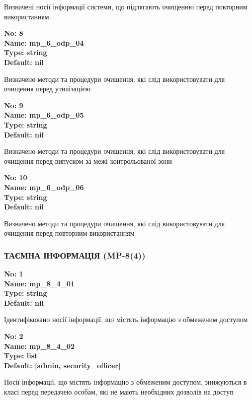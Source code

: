 \documentclass{article}
\begin{document}
{\footnotesize Визначені носії інформації системи, що підлягають очищенню перед повторним використанням}


{\footnotesize\bfseries
No: 8\\
Name: mp\_6\_odp\_04\\
Type: string\\
Default: nil
}

{\footnotesize Визначено методи та процедури очищення, які слід використовувати для очищення перед утилізацією}


{\footnotesize\bfseries
No: 9\\
Name: mp\_6\_odp\_05\\
Type: string\\
Default: nil
}

{\footnotesize Визначено методи та процедури очищення, які слід використовувати для очищення перед випуском за межі контрольованої зони}


{\footnotesize\bfseries
No: 10\\
Name: mp\_6\_odp\_06\\
Type: string\\
Default: nil
}

{\footnotesize Визначено методи та процедури очищення, які слід використовувати для очищення перед повторним використанням}




\subsubsection{ТАЄМНА ІНФОРМАЦІЯ (MP-8(4))}


\vspace{10pt}
{\footnotesize\bfseries
No: 1\\
Name: mp\_8\_4\_01\\
Type: string\\
Default: nil
}

{\footnotesize Ідентифіковано носії інформації, що містять інформацію з обмеженим доступом}


{\footnotesize\bfseries
No: 2\\
Name: mp\_8\_4\_02\\
Type: list\\
Default: [\textquotedbl{}admin\textquotedbl{}, \textquotedbl{}security\_officer\textquotedbl{}]
}

{\footnotesize Носії інформації, що містять інформацію з обмеженим доступом, знижуються в класі перед передачею особам, які не мають необхідних дозволів на доступ}
\end{document}

